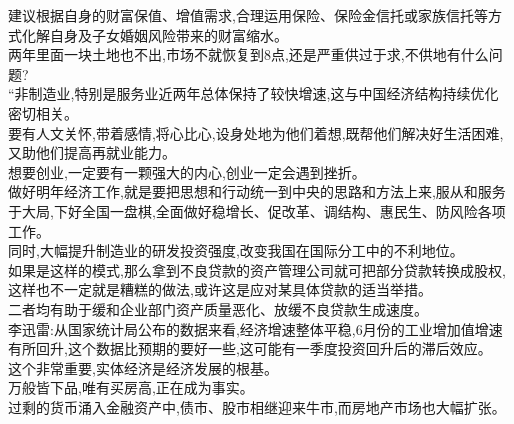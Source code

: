 \documentclass[runningheads,a4paper]{llncs}
\begin{document}
\begin{CJK*}{UTF8}{gbsn}
建议根据自身的\colorbox{green!30}{财富保值}、\colorbox{green!30}{增值需求},合理运用\colorbox{green!30}{保险}、\colorbox{green!30}{保险金信托}或\colorbox{green!30}{家族信托}等方式化解自身及子女\colorbox{green!30}{婚姻风险}带来的\colorbox{green!30}{财富缩水}。\\
两年里面一块土地也不出,\colorbox{red!30}{市场}不就恢复到8点,还是严重供过于求,不供地有什么问题?\\
“\colorbox{green!30}{非制造业},特别是\colorbox{green!30}{服务业}近两年总体保持了较快\colorbox{red!30}{增速},这与\colorbox{green!30}{中国经济结构持续优化}密切相关。\\
要有人文关怀,带着感情,将心比心,设身处地为他们着想,既帮他们解决好生活困难,又助他们提高\colorbox{green!30}{再就业能力}。\\
想要创业,一定要有一颗强大的内心,\colorbox{red!30}{创业}一定会遇到挫折。\\
做好\colorbox{green!30}{明年经济工作},就是要把思想和行动统一到\colorbox{green!30}{中央}的思路和方法上来,服从和服务于大局,下好全国一盘棋,全面做好\colorbox{red!30}{稳增长}、\colorbox{red!30}{促}\colorbox{green!30}{改革}、\colorbox{red!30}{调结构}、\colorbox{red!30}{惠}\colorbox{green!30}{民生}、\colorbox{red!30}{防}\colorbox{green!30}{风险}各项工作。\\
同时,大幅提升\colorbox{green!30}{制造业}的\colorbox{green!30}{研发投资强度},改变我国在\colorbox{red!30}{国际分工}中的不利地位。\\
如果是这样的模式,那么拿到\colorbox{green!30}{不良贷款}的\colorbox{green!30}{资产管理公司}就可把\colorbox{red!30}{部分}\colorbox{green!30}{贷款}转换成\colorbox{green!30}{股权},这样也不一定就是糟糕的做法,或许这是应对某\colorbox{red!30}{具体}\colorbox{green!30}{贷款}的适当举措。\\
二者均有助于缓和\colorbox{green!30}{企业部门资产质量}\colorbox{red!30}{恶化}、放缓\colorbox{green!30}{不良贷款生成速度}。\\
\colorbox{green!30}{李迅雷}:从\colorbox{green!30}{国家统计局}公布的\colorbox{green!30}{数据}来看,\colorbox{green!30}{经济增速}整体平稳,6月份的\colorbox{green!30}{工业增加值增速}有所回升,这个\colorbox{green!30}{数据}比预期的要好一些,这可能有\colorbox{red!30}{一季度}\colorbox{green!30}{投资}\colorbox{red!30}{回升}后的\colorbox{green!30}{滞后效应}。\\
这个非常重要,\colorbox{green!30}{实体经济}是\colorbox{green!30}{经济发展}的根基。\\
万般皆下品,唯有买房高,正在成为事实。\\
过剩的\colorbox{green!30}{货币}涌入\colorbox{green!30}{金融资产}中,\colorbox{green!30}{债市}、\colorbox{green!30}{股市}相继迎来\colorbox{green!30}{牛市},而\colorbox{green!30}{房地产市场}也大幅扩张。\\

\end{CJK*}
\end{document}
